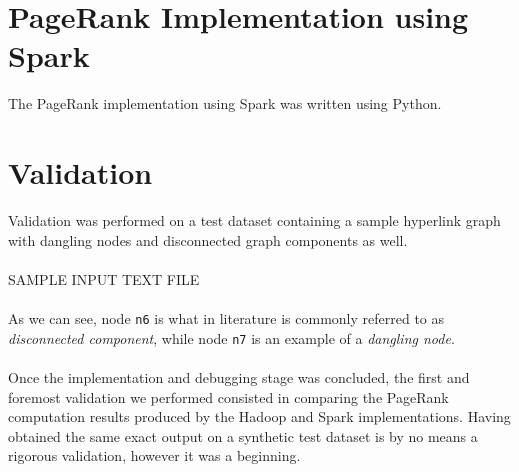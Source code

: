 \documentclass[11pt,a4paper]{article}
\begin{document}
\section{PageRank Implementation using Spark}
The PageRank implementation using Spark was written using Python.
\section{Validation}
Validation was performed on a test dataset containing a sample hyperlink graph with  dangling nodes and disconnected graph components as well.\\
\\
SAMPLE INPUT TEXT FILE\\
\\
As we can see, node \texttt{n6} is what in literature is commonly referred to as \textit{disconnected component}, while node \texttt{n7} is an example of a \textit{dangling node}.\\
\\
Once the implementation and debugging stage was concluded, the first and foremost validation we performed consisted in comparing the PageRank computation results produced by the Hadoop and Spark implementations. Having obtained the same exact output on a synthetic test dataset is by no means a rigorous validation, however it was a beginning.
\end{document}
